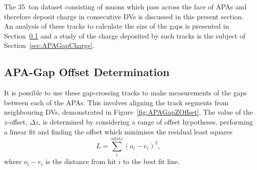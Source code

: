 The 35~ton dataset consisting of muons which pass across the face of APAs and therefore deposit charge in consecutive DVs is discussed in this present section.  An analysis of these tracks to calculate the size of the gaps is presented in Section~\ref{sec:APAGapOffsets} and a study of the charge deposited by such tracks is the subject of Section~\ref{sec:APAGapCharge}.

\subsection{APA-Gap Offset Determination}\label{sec:APAGapOffsets}

It is possible to use these gap-crossing tracks to make measurements of the gaps between each of the APAs.  This involves aligning the track segments from neighbouring DVs, demonstrated in Figure~\ref{fig:APAGapZOffset}.  The value of the $z$-offset, $\Delta z$, is determined by considering a range of offset hypotheses, performing a linear fit and finding the offset which minimises the residual least squares
\begin{equation}
  L = \sum_i^{nhits} (o_i - e_i)^2,
\end{equation}
where $o_i-e_i$ is the distance from hit $i$ to the best fit line.

